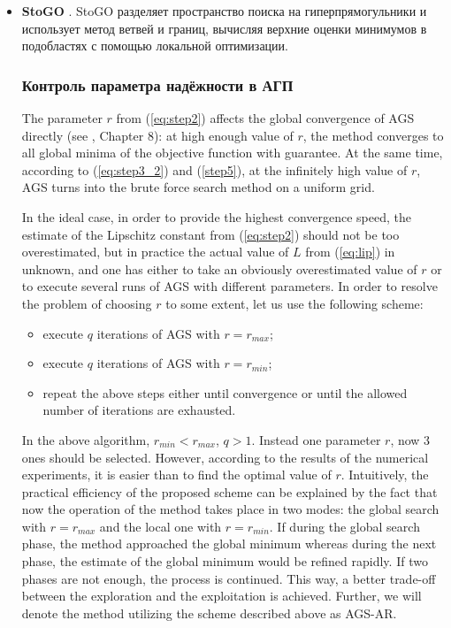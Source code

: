 \begin{itemize}
  \item \textbf{StoGO} \cite{Madsen1998}. StoGO разделяет пространство поиска на гиперпрямогульники и использует метод ветвей и
  границ, вычисляя верхние оценки минимумов в подобластях с помощью локальной оптимизации.

\subsubsection{Контроль параметра надёжности в АГП}

The parameter $r$ from (\ref{eq:step2}) affects the global convergence of AGS directly (see
\cite{strSergGO}, Chapter 8):
at high enough value of $r$, the method converges to all global minima of the objective function with
guarantee.
At the same time, according to (\ref{eq:step3_2}) and (\ref{step5}), at the infinitely high value of $r$, AGS turns into
the brute force search method on a uniform grid.

In the ideal case, in order to provide the highest convergence speed, the estimate of the Lipschitz
constant from (\ref{eq:step2})
should not be too overestimated, but in practice the actual value of $L$ from (\ref{eq:lip}) in
unknown, and one has either to take an obviously overestimated value of $r$ or to execute several
runs of AGS with different parameters. In order to resolve the problem of choosing $r$ to some extent,
let us use the following scheme:
\begin{itemize}
  \item execute $q$ iterations of AGS with $r=r_{max}$;
  \item execute $q$ iterations of AGS with $r=r_{min}$;
  \item repeat the above steps either until convergence or until the allowed number of iterations are
exhausted.
\end{itemize}

In the above algorithm, $r_{min} < r_{max}$, $q > 1$. Instead one parameter $r$, now
3 ones should be selected. However, according to the results of the numerical experiments, it is easier
than to find the optimal value of $r$.
Intuitively, the practical efficiency of the proposed scheme can be explained by the fact that now the
operation of the method takes place in two modes: the global search with $r=r_{max}$ and the local
one with $r=r_{min}$. If during the global search phase, the method approached the global minimum
whereas during the next phase, the estimate of the global minimum  would be refined rapidly.
If two phases are not enough, the process is continued. This way, a better trade-off
between the exploration and the exploitation is achieved.
Further, we will denote the method utilizing the scheme described above as AGS-AR.

\end{itemize}


